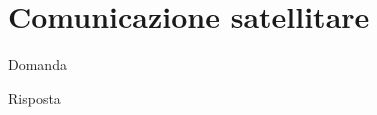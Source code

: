 \section{Comunicazione satellitare}

\begin{questions}
    \question Domanda
    
    \begin{solution}
        Risposta
    \end{solution}
\end{questions}